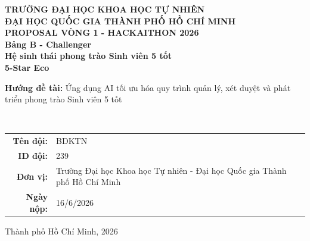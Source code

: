 \begin{titlepage}

\begin{center}
\vspace*{0.8cm}
{\Large \textbf{TRƯỜNG ĐẠI HỌC KHOA HỌC TỰ NHIÊN}}\\[4pt]
{\large \textbf{ĐẠI HỌC QUỐC GIA THÀNH PHỐ HỒ CHÍ MINH}}\\[1.4cm]

{\Large \textbf{PROPOSAL VÒNG 1 - HACKAITHON 2026}}\\[0.4cm]
{\large \textbf{Bảng B - Challenger}}\\[1.4cm]

{\Huge \textbf{Hệ sinh thái phong trào Sinh viên 5 tốt}}\\[0.4cm]
{\LARGE \textbf{5-Star Eco}}\\[1cm]

\begin{minipage}{0.82\textwidth}
\centering
\textbf{Hướng đề tài:} Ứng dụng AI tối ưu hóa quy trình quản lý, xét duyệt và phát triển phong trào Sinh viên 5 tốt
\end{minipage}\\[1.2cm]

\begin{tabular}{rl}
\textbf{Tên đội:} & BDKTN \\
\textbf{ID đội:} & 239 \\
\textbf{Đơn vị:} & Trường Đại học Khoa học Tự nhiên - Đại học Quốc gia Thành phố Hồ Chí Minh \\
\textbf{Ngày nộp:} & 16/6/2026 \\
\end{tabular}

\vfill
{\large Thành phố Hồ Chí Minh, 2026}
\end{center}
\end{titlepage}
